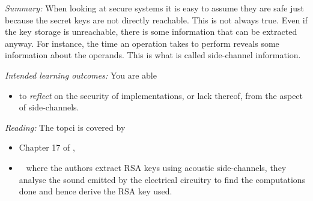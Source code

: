 \emph{Summary:}
When looking at secure systems it is easy to assume they are safe just because 
the secret keys are not directly reachable.
This is not always true.
Even if the key storage is unreachable, there is some information that can be 
extracted anyway.
For instance, the time an operation takes to perform reveals some information 
about the operands.
This is what is called side-channel information.

\emph{Intended learning outcomes:}
You are able
\begin{itemize}
  \item to \emph{reflect} on the security of implementations, or lack thereof, 
    from the aspect of side-channels.
\end{itemize}

\emph{Reading:}
The topci is covered by
\begin{itemize}
  \item Chapter 17 of \cite{Anderson2008sea},
  \item {}~\cite{genkin2013rsa} where the authors 
    extract RSA keys using acoustic side-channels, \ie they analyse the sound 
    emitted by the electrical circuitry to find the computations done and hence 
    derive the RSA key used.
\end{itemize}
